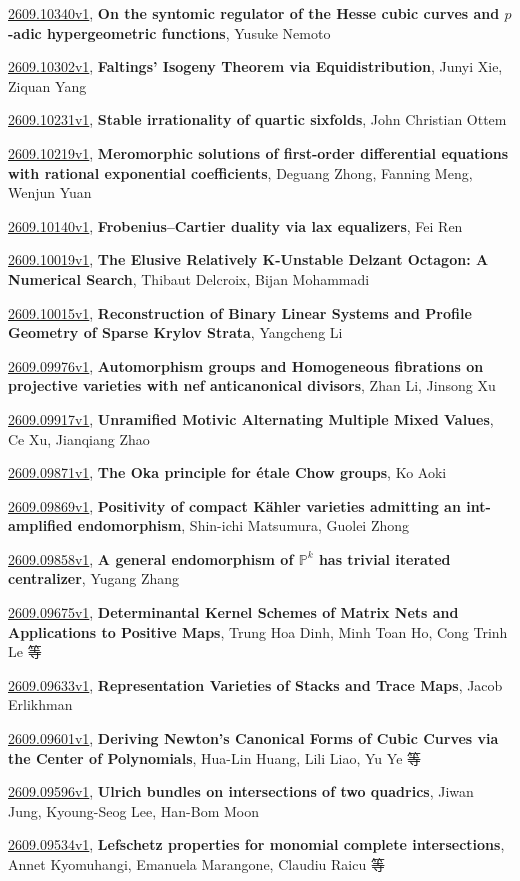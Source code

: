 \documentclass[9pt, a4paper]{article}
\theoremstyle{plain}
\theoremstyle{definition}
\theoremstyle{remark}
\newcommand{\arxiv}[3]{\href{https://arxiv.org/abs/#1}{#1}, \textbf{\textcolor{arxivblue}{#2}}, #3}
\begin{document}
\arxiv{2609.10340v1}{On the syntomic regulator of the Hesse cubic curves and $p$-adic hypergeometric functions}{Yusuke Nemoto}

\arxiv{2609.10302v1}{Faltings' Isogeny Theorem via Equidistribution}{Junyi Xie, Ziquan Yang}

\arxiv{2609.10231v1}{Stable irrationality of quartic sixfolds}{John Christian Ottem}

\arxiv{2609.10219v1}{Meromorphic solutions of first-order differential equations with rational exponential coefficients}{Deguang Zhong, Fanning Meng, Wenjun Yuan}

\arxiv{2609.10140v1}{Frobenius--Cartier duality via lax equalizers}{Fei Ren}

\arxiv{2609.10019v1}{The Elusive Relatively K-Unstable Delzant Octagon: A Numerical Search}{Thibaut Delcroix, Bijan Mohammadi}

\arxiv{2609.10015v1}{Reconstruction of Binary Linear Systems and Profile Geometry of Sparse Krylov Strata}{Yangcheng Li}

\arxiv{2609.09976v1}{Automorphism groups and Homogeneous fibrations on projective varieties with nef anticanonical divisors}{Zhan Li, Jinsong Xu}

\arxiv{2609.09917v1}{Unramified Motivic Alternating Multiple Mixed Values}{Ce Xu, Jianqiang Zhao}

\arxiv{2609.09871v1}{The Oka principle for étale Chow groups}{Ko Aoki}

\arxiv{2609.09869v1}{Positivity of compact Kähler varieties admitting an int-amplified endomorphism}{Shin-ichi Matsumura, Guolei Zhong}

\arxiv{2609.09858v1}{A general endomorphism of $\mathbb{P}^k$ has trivial iterated centralizer}{Yugang Zhang}

\arxiv{2609.09675v1}{Determinantal Kernel Schemes of Matrix Nets and Applications to Positive Maps}{Trung Hoa Dinh, Minh Toan Ho, Cong Trinh Le 等}

\arxiv{2609.09633v1}{Representation Varieties of Stacks and Trace Maps}{Jacob Erlikhman}

\arxiv{2609.09601v1}{Deriving Newton's Canonical Forms of Cubic Curves via the Center of Polynomials}{Hua-Lin Huang, Lili Liao, Yu Ye 等}

\arxiv{2609.09596v1}{Ulrich bundles on intersections of two quadrics}{Jiwan Jung, Kyoung-Seog Lee, Han-Bom Moon}

\arxiv{2609.09534v1}{Lefschetz properties for monomial complete intersections}{Annet Kyomuhangi, Emanuela Marangone, Claudiu Raicu 等}
\end{document}
